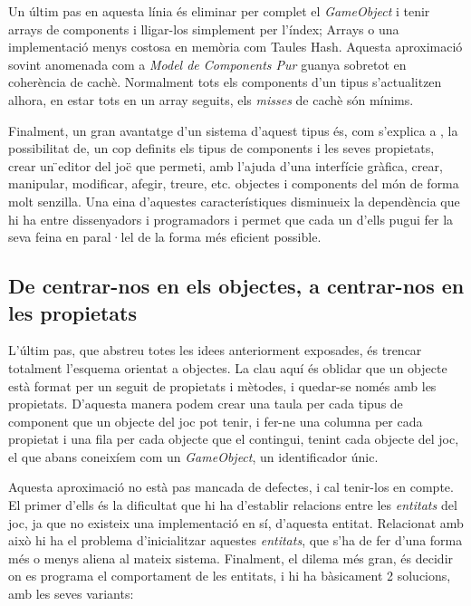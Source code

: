 Un últim pas en aquesta línia és eliminar per complet el {\em GameObject} i tenir arrays de components i lligar-los simplement per l'índex; Arrays o una implementació menys costosa en memòria com Taules Hash. Aquesta aproximació sovint anomenada com a {\em Model de Components Pur} guanya sobretot en coherència de cachè. Normalment tots els components d'un tipus s'actualitzen alhora, en estar tots en un array seguits, els {\em misses} de cachè són mínims.

Finalment, un gran avantatge d'un sistema d'aquest tipus és, com s'explica a \citep{Leonard99}, la possibilitat de, un cop definits els tipus de components i les seves propietats, crear un \"{}editor del joc\"{} que permeti, amb l'ajuda d'una interfície gràfica, crear, manipular, modificar, afegir, treure, etc. objectes i components del món de forma molt senzilla. Una eina d'aquestes característiques disminueix la dependència que hi ha entre dissenyadors i programadors i permet que cada un d'ells pugui fer la seva feina en paral·lel de la forma més eficient possible.

\subsection{De centrar-nos en els objectes, a centrar-nos en les propietats}

L'últim pas, que abstreu totes les idees anteriorment exposades, és trencar totalment l'esquema orientat a objectes. La clau aquí és oblidar que un objecte està format per un seguit de propietats i mètodes, i quedar-se només amb les propietats. D'aquesta manera podem crear una taula per cada tipus de component que un objecte del joc pot tenir, i fer-ne una columna per cada propietat i una fila per cada objecte que el contingui, tenint cada objecte del joc, el que abans coneixíem com un {\em GameObject}, un identificador únic.

Aquesta aproximació no està pas mancada de defectes, i cal tenir-los en compte. El primer d'ells és la dificultat que hi ha d'establir relacions entre les {\em entitats} del joc, ja que no existeix una implementació en sí, d'aquesta entitat. Relacionat amb això hi ha el problema d'inicialitzar aquestes {\em entitats}, que s'ha de fer d'una forma més o menys aliena al mateix sistema. Finalment, el dilema més gran, és decidir on es programa el comportament de les entitats, i hi ha bàsicament 2 solucions, amb les seves variants:

